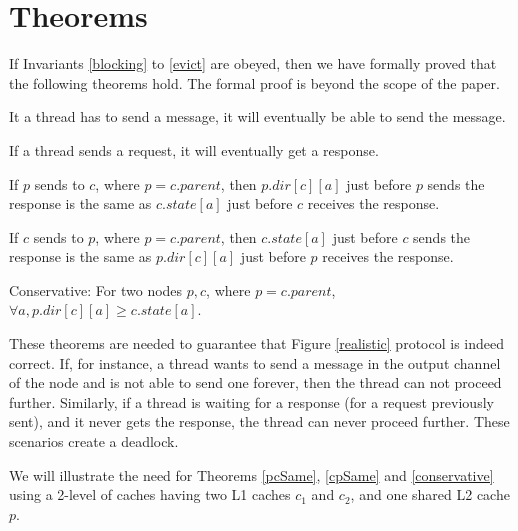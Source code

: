 \section{Theorems}
\label{sec:theorems}

If Invariants \ref{blocking} to \ref{evict} are obeyed, then we have formally
proved that the following theorems hold. The formal proof is beyond the scope of
the paper.

\begin{theorem}
It a thread has to send a message, it will eventually be able to send the
message.
\label{canSend}
\end{theorem}

\begin{theorem}
If a thread sends a request, it will eventually get a response.
\label{willRecv}
\end{theorem}

\begin{theorem}
If $p$ sends  to $c$, where $p = c.parent$, then $p.dir[c][a]$
just before $p$ sends the response is the same as $c.state[a]$ just before $c$
receives the response.
\label{pcSame}
\end{theorem}

\begin{theorem}
If $c$ sends  to $p$, where $p = c.parent$, then $c.state[a]$
just before $c$ sends the response is the same as $p.dir[c][a]$ just before $p$
receives the response.
\label{cpSame}
\end{theorem}

\begin{theorem}
Conservative: For two nodes $p, c$, where $p = c.parent$, $\forall a,
p.dir[c][a] \ge c.state[a]$.
\label{conservative}
\end{theorem}

These theorems are needed to guarantee that Figure \ref{realistic} protocol is
indeed correct. If, for instance, a thread wants to send a message in the output
channel of the node and is not able to send one forever, then the thread can not
proceed further. Similarly, if a thread is waiting for a response (for a request
previously sent), and it never gets the response, the thread can never proceed
further. These scenarios create a deadlock.

We will illustrate the need for Theorems \ref{pcSame}, \ref{cpSame} and
\ref{conservative} using a 2-level of caches having two L1 caches $c_1$ and
$c_2$, and one shared L2 cache $p$.

